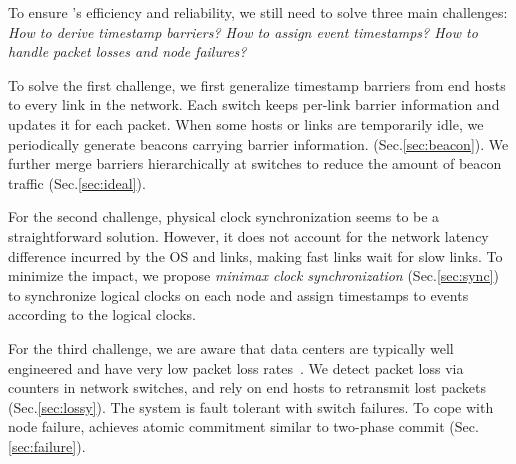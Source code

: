 To ensure \sys's efficiency and reliability, we still need to solve three main challenges: \textit{How to derive timestamp barriers? How to assign event timestamps? How to handle packet losses and node failures?}

To solve the first challenge, we first generalize timestamp barriers from end hosts to every link in the network. Each switch keeps per-link barrier information and updates it for each packet. When some hosts or links are temporarily idle, we periodically generate beacons carrying barrier information. (Sec.\ref{sec:beacon}). We further merge barriers hierarchically at switches to reduce the amount of beacon traffic (Sec.\ref{sec:ideal}).

For the second challenge, physical clock synchronization seems to be a straightforward solution. However, it does not account for the network latency difference incurred by the OS and links, making fast links wait for slow links.
To minimize the impact, we propose \textit{minimax clock synchronization} (Sec.\ref{sec:sync}) to synchronize logical clocks on each node and assign timestamps to events according to the logical clocks.

For the third challenge, we are aware that data centers are typically well engineered and have very low packet loss rates~\cite{ports2015designing}. We detect packet loss via counters in network switches, and rely on end hosts to retransmit lost packets (Sec.\ref{sec:lossy}). The system is fault tolerant with switch failures. To cope with node failure, \sys achieves atomic commitment similar to two-phase commit (Sec.\ref{sec:failure}).





